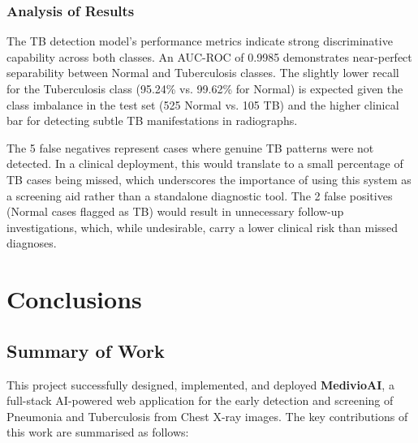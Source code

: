 \documentclass[12pt, a4paper, oneside]{report}
\begin{document}
\subsection{Analysis of Results}

The TB detection model's performance metrics indicate strong discriminative capability across both classes. An AUC-ROC of 0.9985 demonstrates near-perfect separability between Normal and Tuberculosis classes. The slightly lower recall for the Tuberculosis class (95.24\% vs. 99.62\% for Normal) is expected given the class imbalance in the test set (525 Normal vs. 105 TB) and the higher clinical bar for detecting subtle TB manifestations in radiographs.

The 5 false negatives represent cases where genuine TB patterns were not detected. In a clinical deployment, this would translate to a small percentage of TB cases being missed, which underscores the importance of using this system as a screening aid rather than a standalone diagnostic tool. The 2 false positives (Normal cases flagged as TB) would result in unnecessary follow-up investigations, which, while undesirable, carry a lower clinical risk than missed diagnoses.

\chapter{Conclusions}
\label{chap:conclusions}

\section{Summary of Work}
\label{sec:summary}

This project successfully designed, implemented, and deployed \textbf{MedivioAI}, a full-stack AI-powered web application for the early detection and screening of Pneumonia and Tuberculosis from Chest X-ray images. The key contributions of this work are summarised as follows:
\end{document}
